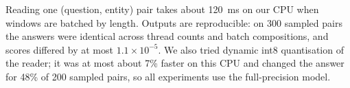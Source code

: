 Reading one (question, entity) pair takes about 120~ms on our CPU when windows are batched by length. Outputs are reproducible: on 300 sampled pairs the answers were identical across thread counts and batch compositions, and scores differed by at most $1.1\times10^{-5}$. We also tried dynamic int8 quantisation of the reader; it was at most about 7\% faster on this CPU and changed the answer for 48\% of 200 sampled pairs, so all experiments use the full-precision model.
